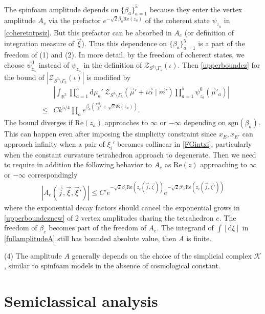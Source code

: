 \documentclass[aps,prd,notitlepage,nofootinbib,superscriptaddress,groupedaddress,twocolumn]{revtex4-1}
\def\R{\mathbb{R}}
\def\sgn{\text{sgn}}
\def\be{\begin{eqnarray}}
\def\ee{\end{eqnarray}}
\newcommand{\ck}{\mathcal K}
\newcommand{\cz}{\mathcal Z}
\renewcommand{\a}{\alpha}
\renewcommand{\b}{\beta}
\newcommand{\G}{\Gamma}
\newcommand{\rmd}{\mathrm d}
\newcommand{\lt}{\left}
\newcommand{\rt}{\right}
\newcommand{\re}{\mathrm{Re}}
\begin{document}
The spinfoam amplitude depends on $\{\b_a\}_{a=1}^5$ because they enter the vertex amplitude $A_v$ via the prefactor $e^{-\sqrt{2}\b_a\re(z_a)}$ of the coherent state $\psi_{z_a}$ in \eqref{coheretntpsiz}. But this prefactor can be absorbed in $A_e$ (or definition of integration measure of $\vec{\xi}$). Thus this dependence on $\{\b_a\}_{a=1}^5$ is a part of the freedom of (1) and (2). In more detail, by the freedom of coherent states, we choose $\psi^0_{z_a}$ instead of $\psi_{z_a}$ in the definition of $\cz_{S^3\setminus\G_5}(\iota)$. Then \eqref{upperboundcz} for the bound of $|\cz_{S^3\setminus\G_5}(\iota)|$ is modified by
\be
&&\lt|\int_{\R^{5}}\prod_{a=1}^5\rmd \mu_a'\ \cz_{S^3\setminus\G_5}(\vec{\mu}'+i\vec{\a}\mid \vec{m}')\prod_{a=1}^5\psi^0_{z_a}(\vec{\mu}'_a)\rt|\nonumber\\
&\leq& Ck^{5/4}\prod_ae^{\beta_a  \left(\frac{\pi  \beta_a }{k}+\sqrt{2} \Re(z_a)\right)}.\label{upperboundcznew}
\ee
The bound diverges if $\mathrm{Re}(z_a)$ approaches to $\infty$ or $-\infty$ depending on $\sgn(\b_a)$. This can happen even after imposing the simplicity constraint since $x_{E},x_{E'}$ can approach infinity when a pair of $\xi_i'$ becomes collinear in \eqref{FGintxi}, particularly when the constant curvature tetrahedron approach to degenerate. Then we need to require in addition the following behavior to $A_e$ as $\mathrm{Re}(z)$ approaching to $\infty$ or $-\infty$ correspondingly
\be
|A_e(\vec{j},\vec{\xi},\vec{\xi}')|\leq C' e^{-\sqrt{2}\b_e\mathrm{Re}(z_e(\vec{j},\vec{\xi}))}e^{-\sqrt{2}\b'_e\mathrm{Re}(z_e(\vec{j},\vec{\xi}'))}\nonumber
\ee
where the exponential decay factors should cancel the exponential grows in \eqref{upperboundcznew} of 2 vertex amplitudes sharing the tetrahedron $e$. The freedom of $\b_e$ becomes part of the freedom of $A_e$. The integrand of $\int[\rmd\xi]$ in \eqref{fullamplitudeA} still has bounded absolute value, then $A$ is finite. %

(4) The amplitude $A$ generally depends on the choice of the simplicial complex $\ck$, similar to spinfoam models in the absence of cosmological constant. %









\section{Semiclassical analysis}\label{Semiclassical analysis}
\end{document}
